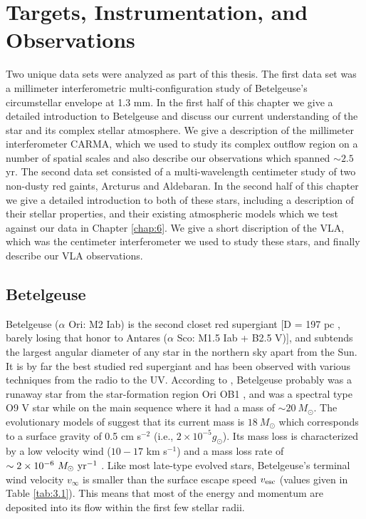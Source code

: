
\chapter{Targets, Instrumentation, and Observations}
\label{chap:3}

Two unique data sets were analyzed as part of this thesis. The first data set was a millimeter interferometric multi-configuration study of Betelgeuse's circumstellar envelope at 1.3 mm. In the first half of this chapter we give a detailed introduction to Betelgeuse and discuss our current understanding of the star and its complex stellar atmosphere. We give a description of the millimeter interferometer CARMA, which we used to study its complex outflow region on a number of spatial scales and also describe our observations which spanned $\sim 2.5$ yr. The second data set consisted of a multi-wavelength centimeter study of two non-dusty red gaints, Arcturus and Aldebaran. In the second half of this chapter we give a detailed introduction to both of these stars, including a description of their stellar properties, and their existing atmospheric models which we test against our data in Chapter \ref{chap:6}. We give a short discription of the VLA, which was the centimeter interferometer we used to study these stars, and finally describe our VLA observations.

\section{Betelgeuse}\label{sec:3.1}
Betelgeuse ($\alpha$ Ori: M2 Iab) is the second closet red supergiant [D = 197 pc \citep{harper_2008}, barely losing that honor to Antares ($\alpha$ Sco: M1.5 Iab + B2.5 V)], and subtends the largest angular diameter of any star in the northern sky apart from the Sun. It is by far the best studied red supergiant and has been observed with various techniques from the radio to the UV. According to \cite{harper_2001}, Betelgeuse probably was a runaway star from the star-formation region Ori OB1 \cite[see, e.g.,][]{hoogerwerf_2000}, and was a spectral type O9 V star while on the main sequence where it had a mass of $\sim 20 \ M_{\odot}$. The evolutionary models of \cite{meynet_2003} suggest that its current mass is $18 \ M_{\odot}$ which corresponds to a surface gravity of 0.5 cm s$^{-2}$  (i.e., $2\times 10^{-5}g_{\odot}$). Its mass loss is characterized by a low velocity wind ($10-17$ km s$^{-1}$) and a mass loss rate of $\sim 2\times 10^{-6} \ M_{\odot} \ \rm{yr}^{-1}$ \citep{harper_2001}. Like most late-type evolved stars, Betelgeuse's  terminal wind velocity $v_{\infty}$ is smaller than the surface escape speed $v_{\rm{esc}}$ (values given in Table \ref{tab:3.1}). This means that most of the energy and momentum are deposited into its flow within the first few stellar radii.

